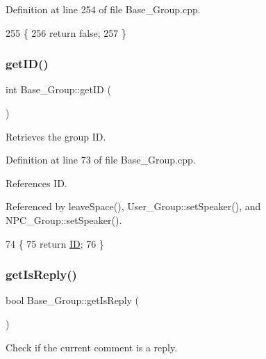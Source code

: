 Definition at line 254 of file Base\+\_\+\+Group.\+cpp.


\begin{DoxyCode}
255 \{
256     \textcolor{keywordflow}{return} \textcolor{keyword}{false};
257 \}
\end{DoxyCode}
\mbox{\label{class_base___group_a7299ae154b26d741ac2f6f794bc3a544}} 
\subsubsection{\texorpdfstring{get\+I\+D()}{getID()}}
{\footnotesize\ttfamily int Base\+\_\+\+Group\+::get\+ID (\begin{DoxyParamCaption}{ }\end{DoxyParamCaption})}



Retrieves the group ID. 



Definition at line 73 of file Base\+\_\+\+Group.\+cpp.



References ID.



Referenced by leave\+Space(), User\+\_\+\+Group\+::set\+Speaker(), and N\+P\+C\+\_\+\+Group\+::set\+Speaker().


\begin{DoxyCode}
74 \{
75     \textcolor{keywordflow}{return} \hyperlink{class_base___group_ae6ea7525642b45edafb56589d9945f90}{ID};
76 \}
\end{DoxyCode}
\mbox{\label{class_base___group_a878700b51979d0acd3eb83cdfa4c0449}} 
\subsubsection{\texorpdfstring{get\+Is\+Reply()}{getIsReply()}}
{\footnotesize\ttfamily bool Base\+\_\+\+Group\+::get\+Is\+Reply (\begin{DoxyParamCaption}{ }\end{DoxyParamCaption})}



Check if the current comment is a reply. 



